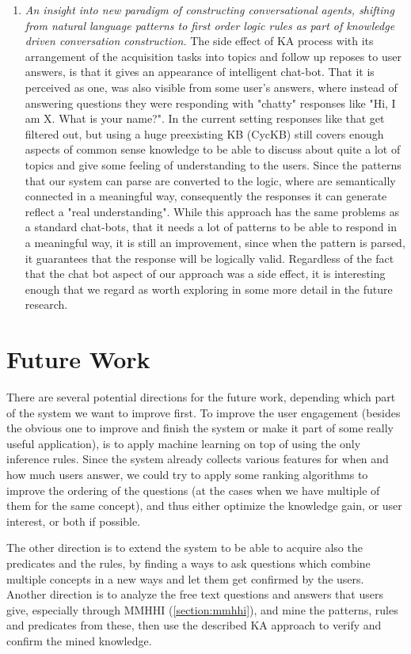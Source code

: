 \begin{enumerate}
	\item \emph{An insight into new paradigm of constructing conversational agents,	shifting from natural language patterns to first order logic rules as part of knowledge driven conversation construction.} The side effect of KA process with its arrangement of the acquisition tasks into topics and follow up reposes to user answers, is that it gives an appearance of  intelligent	chat-bot. That it is perceived as one, was also visible from some user's answers, where instead of answering questions they were
	responding with "chatty" responses like "Hi, I am X. What is your name?".
	In the current setting responses like that get filtered out, but using 
	a huge preexisting KB (CycKB) still covers enough aspects of common sense knowledge to be able to discuss about quite a lot of topics and give some feeling of understanding to the users. Since the patterns that our system
	can parse are converted to the logic, where are semantically connected 
	in a meaningful way, consequently the responses it can generate reflect a "real understanding". While this approach has the same problems as a standard chat-bots, that it needs a lot of patterns to be able to respond
	in a meaningful way, it is still an improvement, since when the pattern is
	parsed, it guarantees that the response will be logically valid. Regardless of the fact that the chat bot aspect of our approach was a side effect, it
	is interesting enough that we regard as worth exploring in some more detail
	in the future research. 
\end{enumerate}

\section{Future Work}
There are several potential directions for the future work, depending which 
part of the system we want to improve first. 
To improve the user engagement (besides the obvious one to improve and finish
the system or make it part of some really useful application), is to apply
machine learning on top of using the only inference rules. Since the system
already collects various features for when and how much users answer, we could
try to apply some ranking algorithms to improve the ordering of the questions 
(at the cases when we have multiple of them for the same concept), and thus
either optimize the knowledge gain, or user interest, or both if possible.

The other direction is to extend the system to be able to acquire also the
predicates and the rules, by finding a ways to ask questions which combine 
multiple concepts in a new ways and let them get confirmed by the users. 
Another direction is to analyze the free text questions and answers that users
give, especially through MMHHI (\autoref{section:mmhhi}), and mine the patterns,
rules and predicates from these, then use the described KA approach to verify
and confirm the mined knowledge.

